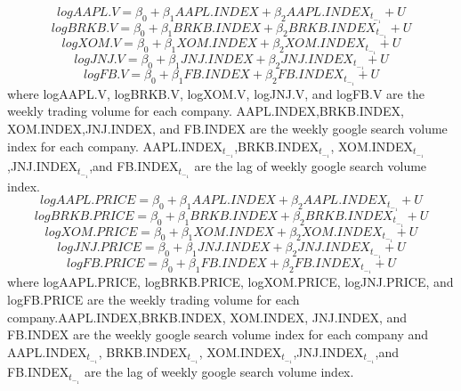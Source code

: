 \documentclass[12pt,english]{article}
\begin{document}
\newline
\begin{equation}
    logAAPL.V = \beta_0 + \beta_1 AAPL.INDEX + \beta_2 AAPL.INDEX_t_-_1 + U
\end{equation}
\begin{equation}
    logBRKB.V = \beta_0 + \beta_1 BRKB.INDEX + \beta_2 BRKB.INDEX_t_-_1 + U
\end{equation}
\begin{equation}
    logXOM.V = \beta_0 + \beta_1 XOM.INDEX + \beta_2 XOM.INDEX_t_-_1 + U
\end{equation}
\begin{equation}
    logJNJ.V = \beta_0 + \beta_1 JNJ.INDEX + \beta_2 JNJ.INDEX_t_-_1 + U
\end{equation}
\begin{equation}
    logFB.V = \beta_0 + \beta_1 FB.INDEX + \beta_2 FB.INDEX_t_-_1 + U
\end{equation}
\newline
where logAAPL.V, logBRKB.V, logXOM.V, logJNJ.V, and logFB.V are the weekly trading volume for each company. AAPL.INDEX,BRKB.INDEX, XOM.INDEX,JNJ.INDEX, and FB.INDEX are the weekly google search volume index for each company. AAPL.INDEX$_t_-_1$,BRKB.INDEX$_t_-_1$, XOM.INDEX$_t_-_1$,JNJ.INDEX$_t_-_1$,and FB.INDEX$_t_-_1$ are the lag of weekly google search volume index.
\newline
\begin{equation}
    logAAPL.PRICE = \beta_0 + \beta_1 AAPL.INDEX + \beta_2 AAPL.INDEX_t_-_1 + U
\end{equation}
\begin{equation}
    logBRKB.PRICE = \beta_0 + \beta_1 BRKB.INDEX + \beta_2 BRKB.INDEX_t_-_1 + U
\end{equation}
\begin{equation}
    logXOM.PRICE = \beta_0 + \beta_1 XOM.INDEX + \beta_2 XOM.INDEX_t_-_1 + U
\end{equation}
\begin{equation}
    logJNJ.PRICE = \beta_0 + \beta_1 JNJ.INDEX + \beta_2 JNJ.INDEX_t_-_1 + U
\end{equation}
\begin{equation}
    logFB.PRICE = \beta_0 + \beta_1 FB.INDEX + \beta_2 FB.INDEX_t_-_1 + U
\end{equation}
\newline
where logAAPL.PRICE, logBRKB.PRICE, logXOM.PRICE, logJNJ.PRICE, and logFB.PRICE are the weekly trading volume for each company.AAPL.INDEX,BRKB.INDEX, XOM.INDEX, JNJ.INDEX, and FB.INDEX are the weekly google search volume index for each company and AAPL.INDEX$_t_-_1$, BRKB.INDEX$_t_-_1$, XOM.INDEX$_t_-_1$,JNJ.INDEX$_t_-_1$,and FB.INDEX$_t_-_1$ are the lag of weekly google search volume index.
\end{document}
